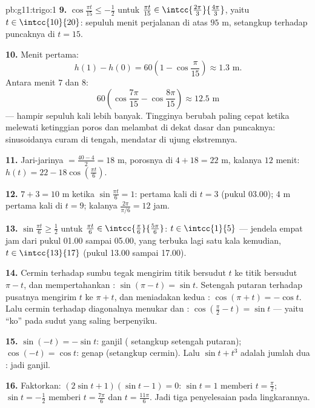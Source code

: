 \begin{solution}{pb:g11:trigo:1}
\textbf{9.} $\cos\frac{\pi t}{15} \leq -\frac12$ untuk
$\frac{\pi t}{15} \in \intcc{\frac{2\pi}{3}}{\frac{4\pi}{3}}$,
yaitu $t \in \intcc{10}{20}$: sepuluh menit perjalanan di atas
$95$ m, setangkup terhadap puncaknya di $t = 15$.

\textbf{10.} Menit pertama:
\[
h(1) - h(0) = 60\left(1 - \cos\frac{\pi}{15}\right)
\approx 1.3 \text{ m}.
\]
Antara menit $7$ dan $8$:
\[
60\left(\cos\frac{7\pi}{15} - \cos\frac{8\pi}{15}\right)
\approx 12.5 \text{ m}
\]
--- hampir sepuluh kali lebih banyak. Tingginya berubah paling cepat ketika
melewati ketinggian poros dan melambat di dekat dasar dan puncaknya:
sinusoidanya curam di tengah, mendatar di ujung ekstremnya.

\textbf{11.} Jari-jarinya $= \frac{40 - 4}{2} = 18$ m, porosnya di
$4 + 18 = 22$ m, kalanya $12$ menit:
$h(t) = 22 - 18\cos\left(\frac{\pi t}{6}\right)$.

\textbf{12.}  $7 + 3 = 10$ m ketika
$\sin\frac{\pi t}{6} = 1$: pertama kali di $t = 3$ (pukul 03.00);
 $4$ m pertama kali di $t = 9$; kalanya
$\frac{2\pi}{\pi/6} = 12$ jam.

\textbf{13.} $\sin\frac{\pi t}{6} \geq \frac12$ untuk
$\frac{\pi t}{6} \in \intcc{\frac\pi6}{\frac{5\pi}{6}}$:
$t \in \intcc{1}{5}$ --- jendela empat jam dari pukul 01.00 sampai
05.00, yang terbuka lagi satu kala kemudian, $t \in \intcc{13}{17}$
(pukul 13.00 sampai 17.00).

\textbf{14.} Cermin terhadap sumbu tegak mengirim titik bersudut
$t$ ke titik bersudut $\pi - t$, dan mempertahankan
: $\sin(\pi - t) = \sin t$. Setengah putaran terhadap
pusatnya mengirim $t$ ke $\pi + t$, dan meniadakan kedua :
$\cos(\pi + t) = -\cos t$. Lalu cermin terhadap diagonalnya
menukar  dan :
$\cos\left(\frac\pi2 - t\right) = \sin t$ --- yaitu ``ko''
pada sudut yang saling berpenyiku.

\textbf{15.} $\sin(-t) = -\sin t$: ganjil ( setangkup
setengah putaran); $\cos(-t) = \cos t$: genap (setangkup cermin). Lalu
$\sin t + t^3$ adalah jumlah dua : jadi ganjil.

\textbf{16.} Faktorkan: $(2\sin t + 1)(\sin t - 1) = 0$:
$\sin t = 1$ memberi $t = \frac\pi2$;
$\sin t = -\frac12$ memberi $t = \frac{7\pi}{6}$ dan
$t = \frac{11\pi}{6}$. Jadi tiga penyelesaian pada lingkarannya.


\end{solution}
